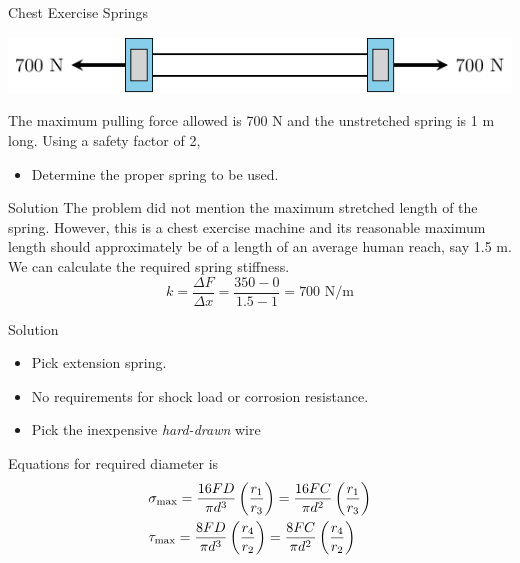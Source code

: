 \documentclass[10pt, svgnames]{beamer}
\begin{document}
\begin{frame}[label={sec:org05f4ac3}]{Chest Exercise Springs}
\begin{center}
\includegraphics[width=.9\linewidth]{pictures/chest-exercise-example.pdf}
\end{center}

The maximum pulling force allowed is 700 N and the unstretched spring is 1 m long. Using a safety factor of 2,

\begin{itemize}
\item Determine the proper spring to be used.
\end{itemize}
\end{frame}

\begin{frame}[label={sec:orgea6a252}]{Solution}
The problem did not mention the maximum stretched length of the spring. However, this is a chest exercise machine and its reasonable maximum length should approximately be of a length of an average human reach, say 1.5 m. We can calculate the required spring stiffness.
\[k = \frac{\Delta F}{\Delta x} = \frac{350 - 0}{1.5 - 1} = 700 \text{ N/m} \]
\end{frame}

\begin{frame}[label={sec:orgf9514b8}]{Solution}
\begin{itemize}
\item Pick extension spring.
\item No requirements for shock load or corrosion resistance.
\item Pick the inexpensive \emph{hard-drawn} wire
\end{itemize}

Equations for required diameter is
\[\begin{gathered}
  \sigma _{\max } = \frac{16FD}{\pi d^3}\left( \frac{r_1}{r_3} \right) = \frac{16FC}{\pi d^2}\left( \frac{r_1}{r_3} \right) \hfill \\
  {\tau _{\max }} = \frac{{8FD}}{{\pi {d^3}}}\left( {\frac{{{r_4}}}{{{r_2}}}} \right) = \frac{{8FC}}{{\pi {d^2}}}\left( {\frac{{{r_4}}}{{{r_2}}}} \right) \hfill \\ 
\end{gathered} \]
\end{frame}
\end{document}
